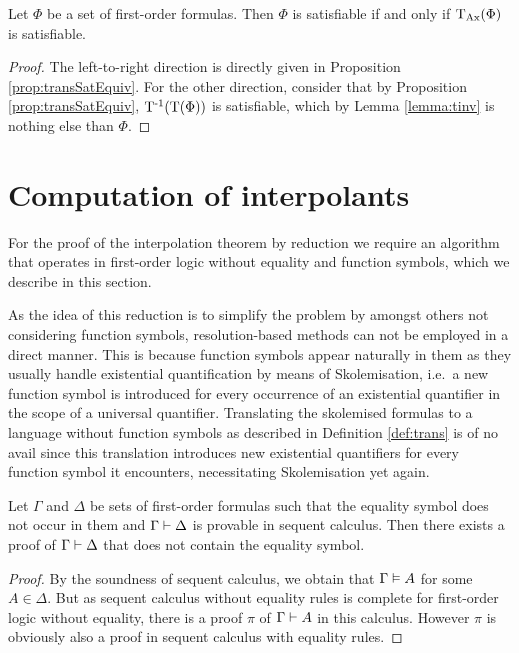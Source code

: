 \begin{corr}
	Let $\Phi$ be a set of first-order formulas.
	Then $\Phi$ is satisfiable if and only if $\operatorname{\operatorname{T}_{Ax}}(\Phi)$ is satisfiable.
\end{corr}
\begin{proof}
	The left-to-right direction is directly given in Proposition \ref{prop:transSatEquiv}.
	For the other direction, consider that by Proposition \ref{prop:transSatEquiv}, $\operatorname{T^{-1}}(\operatorname{T}(\Phi))$ is satisfiable, which by Lemma \ref{lemma:tinv} is nothing else than $\Phi$.
\end{proof}



\section{Computation of interpolants}

For the proof of the interpolation theorem by reduction we require an algorithm that operates in first-order logic without equality and function symbols, which we describe in this section.

\begin{remark}
	As the idea of this reduction is to simplify the problem by amongst others not considering function symbols,
	resolution-based methods can not be employed in a direct manner.
	This is because function symbols appear naturally in them as they usually handle existential quantification by means of Skolemisation, i.e.~a new function symbol is introduced for every occurrence of an existential quantifier in the scope of a universal quantifier.
	Translating the skolemised formulas to a language without function symbols as described in Definition \ref{def:trans} is of no avail since this translation introduces new existential quantifiers for every function symbol it encounters, necessitating Skolemisation yet again.
\end{remark}


\begin{lemma}
	\label{lemma:no_equality_in_proof}
	 Let $\Gamma$ and $\Delta$ be sets of first-order formulas such that the equality symbol does not occur in them and $\Gamma \vdash \Delta$ is provable in sequent calculus. 
	 Then there exists a proof of $\Gamma \vdash \Delta$ that does not contain the equality symbol.
\end{lemma}
\begin{proof}
	By the soundness of sequent calculus, we obtain that $\Gamma \vDash A$ for some $A \in \Delta$.
	But as sequent calculus without equality rules is complete for first-order logic without equality, there is a proof $\pi$ of $\Gamma \vdash A$ in this calculus.
	However $\pi$ is obviously also a proof in sequent calculus with equality rules.
\end{proof}

